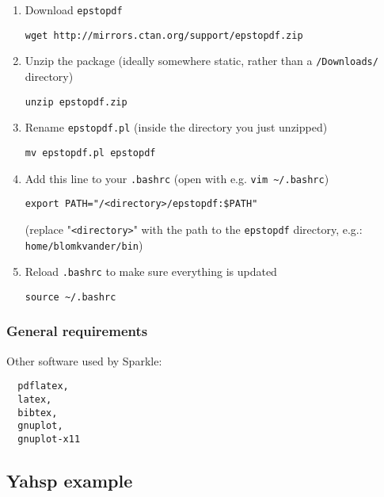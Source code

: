 \documentclass{article}
\begin{document}
\begin{enumerate}
  \item Download \texttt{epstopdf}

  \texttt{wget http://mirrors.ctan.org/support/epstopdf.zip}

  \item Unzip the package (ideally somewhere static, rather than a \texttt{/Downloads/} directory)

  \texttt{unzip epstopdf.zip}

  \item Rename \texttt{epstopdf.pl} (inside the directory you just unzipped)

  \texttt{mv epstopdf.pl epstopdf}

  \item Add this line to your \texttt{.bashrc} (open with e.g. \texttt{vim \~{}/.bashrc})

  \texttt{export PATH="/<directory>/epstopdf:\$PATH"}

  (replace "\texttt{<directory>}" with the path to the \texttt{epstopdf} directory, e.g.: \texttt{home/blomkvander/bin})

  \item Reload \texttt{.bashrc} to make sure everything is updated

  \texttt{source \textasciitilde/.bashrc}
\end{enumerate}

\subsubsection{General requirements}
Other software used by Sparkle:

\begin{verbatim}
  pdflatex,
  latex,
  bibtex,
  gnuplot,
  gnuplot-x11
\end{verbatim}

\subsection{Yahsp example}

\end{document}
